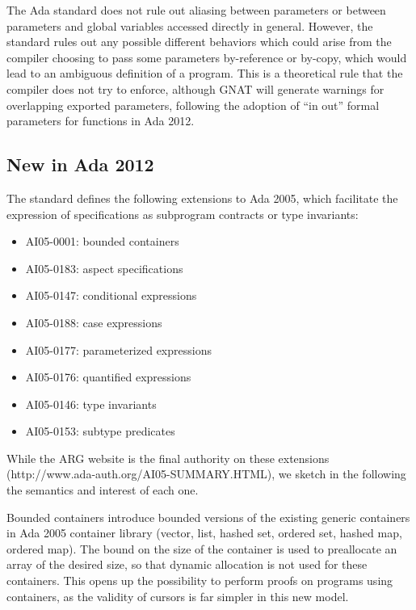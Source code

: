 \documentclass[fullpage]{article}
\begin{document}
The Ada standard does not rule out aliasing between parameters or between
parameters and global variables accessed directly in general. However, the
standard rules out any possible different behaviors which could arise from the
compiler choosing to pass some parameters by-reference or by-copy, which would
lead to an ambiguous definition of a program. This is a theoretical rule that
the compiler does not try to enforce, although GNAT will generate warnings for
overlapping exported parameters, following the adoption of ``in out'' formal
parameters for functions in Ada 2012.

\subsection{New in Ada 2012}

The standard defines the following extensions to Ada 2005, which facilitate the
expression of specifications as subprogram contracts or type invariants:

\begin{itemize}
\item AI05-0001: bounded containers
\item AI05-0183: aspect specifications
\item AI05-0147: conditional expressions
\item AI05-0188: case expressions
\item AI05-0177: parameterized expressions
\item AI05-0176: quantified expressions
\item AI05-0146: type invariants
\item AI05-0153: subtype predicates
\end{itemize}

While the ARG website is the final authority on these extensions
(http://www.ada-auth.org/AI05-SUMMARY.HTML), we sketch in the following the
semantics and interest of each one.

Bounded containers introduce bounded versions of the existing generic
containers in Ada 2005 container library (vector, list, hashed set, ordered
set, hashed map, ordered map). The bound on the size of the container is used
to preallocate an array of the desired size, so that dynamic allocation is not
used for these containers. This opens up the possibility to perform proofs on
programs using containers, as the validity of cursors is far simpler in this
new model.
\end{document}

